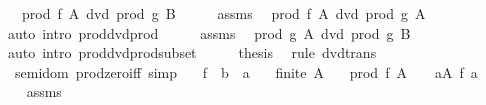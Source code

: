 \begin{isabellebody}
\ \ \ {\isachardoublequoteopen}prod\ f\ A\ dvd\ prod\ g\ B{\isachardoublequoteclose}\isanewline
%
\isadelimproof
%
\endisadelimproof
%
\isatagproof
{}\isamarkupfalse%
\ {\isacharminus}{\kern0pt}\isanewline
\ \ \isamarkupfalse%
\ assms\ \isamarkupfalse%
\ {\isachardoublequoteopen}prod\ f\ A\ dvd\ prod\ g\ A{\isachardoublequoteclose}\isanewline
\ \ \ \ \isamarkupfalse%
\ {\isacharparenleft}{\kern0pt}auto\ intro{\isacharcolon}{\kern0pt}\ prod{\isacharunderscore}{\kern0pt}dvd{\isacharunderscore}{\kern0pt}prod{\isacharparenright}{\kern0pt}\isanewline
\ \ \isamarkupfalse%
\ \isamarkupfalse%
\ assms\ \isamarkupfalse%
\ {\isachardoublequoteopen}prod\ g\ A\ dvd\ prod\ g\ B{\isachardoublequoteclose}\isanewline
\ \ \ \ \isamarkupfalse%
\ {\isacharparenleft}{\kern0pt}auto\ intro{\isacharcolon}{\kern0pt}\ prod{\isacharunderscore}{\kern0pt}dvd{\isacharunderscore}{\kern0pt}prod{\isacharunderscore}{\kern0pt}subset{\isacharparenright}{\kern0pt}\isanewline
\ \ \isamarkupfalse%
\ \isamarkupfalse%
\ {\isacharquery}{\kern0pt}thesis\ \isamarkupfalse%
\ {\isacharparenleft}{\kern0pt}rule\ dvd{\isacharunderscore}{\kern0pt}trans{\isacharparenright}{\kern0pt}\isanewline
{}\isamarkupfalse%
%
\endisatagproof
{\isafoldproof}%
%
\isadelimproof
\isanewline
%
\endisadelimproof
\isanewline
{}\isamarkupfalse%
\isanewline
\isanewline
{}\isamarkupfalse%
\ {\isacharparenleft}{\kern0pt}\ semidom{\isacharparenright}{\kern0pt}\ prod{\isacharunderscore}{\kern0pt}zero{\isacharunderscore}{\kern0pt}iff\ {\isacharbrackleft}{\kern0pt}simp{\isacharbrackright}{\kern0pt}{\isacharcolon}{\kern0pt}\isanewline
\ \ \ f\ {\isacharcolon}{\kern0pt}{\isacharcolon}{\kern0pt}\ {\isachardoublequoteopen}{\isacharprime}{\kern0pt}b\ {\isasymRightarrow}\ {\isacharprime}{\kern0pt}a{\isachardoublequoteclose}\isanewline
\ \ \ {\isachardoublequoteopen}finite\ A{\isachardoublequoteclose}\isanewline
\ \ \ {\isachardoublequoteopen}prod\ f\ A\ {\isacharequal}{\kern0pt}\ {}\ {\isasymlongleftrightarrow}\ {\isacharparenleft}{\kern0pt}{\isasymexists}a{\isasymin}A{\isachardot}{\kern0pt}\ f\ a\ {\isacharequal}{\kern0pt}\ {}{\isacharparenright}{\kern0pt}{\isachardoublequoteclose}\isanewline
%
\isadelimproof
\ \ %
\endisadelimproof
%
\isatagproof
{}\isamarkupfalse%
\ assms\ \isamarkupfalse%

\end{isabellebody}
